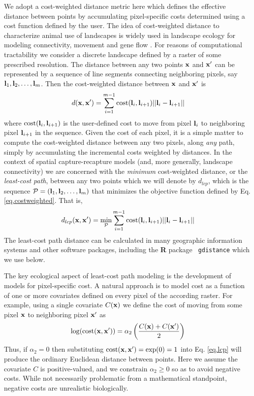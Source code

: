 We adopt a cost-weighted distance metric here which defines the
effective distance between points by accumulating pixel-specific costs
determined using a cost function defined by the user.  The idea of
cost-weighted distance to characterize animal use of landscapes is
widely used in landscape ecology for modeling connectivity, movement
and gene flow \citep{beier_etal:2008}. For reasons of computational
tractability we consider a discrete landscape defined by a raster of
some prescribed resolution. The distance between any two points ${\bf
  x}$ and ${\bf x}'$ can be represented by a sequence of line segments
connecting neighboring pixels, say ${\bf l}_{1},{\bf
  l}_{2},\ldots,{\bf l}_{m}$. Then the cost-weighted distance between
${\bf x}$ and ${\bf x}'$ is
\begin{equation}
 d({\bf x},{\bf x}')
  =  \sum_{i=1}^{m-1} \mbox{cost}({\bf l}_{i},{\bf l}_{i+1})||{\bf l}_{i} - {\bf l}_{i+1}||
\label{eq.costweighted}
\end{equation}
where $\mbox{cost}({\bf l}_{i},{\bf l}_{i+1})$ is the user-defined cost to
move from pixel ${\bf l}_{i}$ to neighboring pixel ${\bf l}_{i+1}$ in
the sequence.  Given the cost of each pixel, it is a simple matter to
compute the cost-weighted distance between any two pixels, along {\it
  any} path, simply by accumulating the incremental costs weighted by
distances.  In the context of spatial capture-recapture models (and,
more generally, landscape connectivity) we are concerned with the {\it
  minimum} cost-weighted distance, or the {\it least-cost path},
between any two points which we will denote by $d_{lcp}$, which is the
sequence ${\cal P} = ({\bf l}_{1},{\bf l}_{2},\ldots,{\bf l}_{m})$
that minimizes the objective function defined by
Eq. \ref{eq.costweighted}. That is,
\begin{equation}
 d_{lcp}({\bf x},{\bf x}')
  =  \min_{{\cal P}} \sum_{i=1}^{m-1} \mbox{cost}({\bf l}_{i},{\bf l}_{i+1})||{\bf l}_{i} - {\bf l}_{i+1}||
\label{eq.lcp}
\end{equation}
The least-cost path distance can be calculated in
 many geographic information systems and other software packages,
including the {\bf R} package \mbox{\tt
  gdistance} \citep{vanetten:2011} which we use below.

The key ecological aspect of least-cost path modeling is the
development
of models for pixel-specific cost.
A natural approach is to
model cost as a function of one or more covariates
defined on every pixel of the according raster. For example, using a
single covariate $C({\bf x})$ we define the cost of moving from some pixel
${\bf x}$ to neighboring pixel ${\bf x}'$ as
\begin{equation}
\log(  \mbox{cost}({\bf x},{\bf x}'))=  \alpha_{2}\left( \frac{C({\bf
      x})+C({\bf x}')}{2}
\right)
\label{ecoldist.eq.cost}
\end{equation}
Thus, if $\alpha_{2} = 0$ then substituting $\mbox{cost}({\bf x},{\bf x}')
=\exp(0) = 1$ into
Eq. \ref{eq.lcp} will produce the ordinary Euclidean distance
between points. Here we assume the covariate $C$ is positive-valued,
and we constrain $\alpha_{2}\ge 0$ so as to avoid
negative costs. While not necessarily problematic from a mathematical
standpoint, negative costs are unrealistic biologically.

